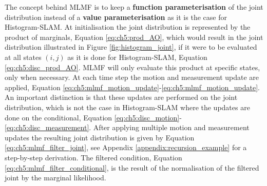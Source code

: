


The concept behind MLMF is to keep a  \textbf{function parameterisation} of the joint distribution instead of a \textbf{value parameterisation} as it is the case 
for Histogram-SLAM. At initialisation the joint distribution is represented by the product of marginals, Equation \ref{eq:ch5:prod_AO}, which 
would result in the joint distribution illustrated in Figure \ref{fig:histogram_joint}, if it were to be evaluated at all states $(i,j)$
as it is done for Histogram-SLAM, Equation \ref{eq:ch5:disc_prod_AO}. MLMF will only evaluate this product at specific states, only when necessary.
At each time step the motion and measurement update are applied, Equation \ref{eq:ch5:mlmf_motion_update}-\ref{eq:ch5:mlmf_motion_update}.
An important distinction is that these updates are performed on the joint distribution, which is not the case in Histogram-SLAM where 
the updates are done on the conditional, Equation \ref{eq:ch5:disc_motion}-\ref{eq:ch5:disc_measurement}. After applying multiple 
motion and measurement updates the resulting joint distribution is given by Equation \ref{eq:ch5:mlmf_filter_joint}, see Appendix \ref{appendix:recursion_example}
for a step-by-step derivation. The filtered condition, Equation \ref{eq:ch5:mlmf_filter_conditional}, is the result of the normalisation of the 
filtered joint by the marginal likelihood.

